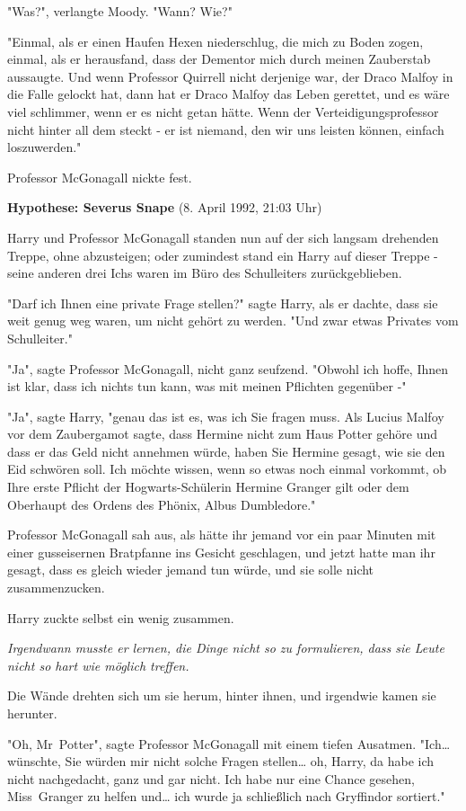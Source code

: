 {"Was?", verlangte Moody. "Wann? Wie?"

"Einmal, als er einen Haufen Hexen niederschlug, die mich zu Boden zogen, einmal, als er herausfand, dass der Dementor mich durch meinen Zauberstab aussaugte. Und wenn Professor Quirrell nicht derjenige war, der Draco Malfoy in die Falle gelockt hat, dann hat er Draco Malfoy das Leben gerettet, und es wäre viel schlimmer, wenn er es nicht getan hätte. Wenn der Verteidigungsprofessor nicht hinter all dem steckt - er ist niemand, den wir uns leisten können, einfach loszuwerden."

Professor McGonagall nickte fest.

\textbf{Hypothese: Severus Snape} (8. April 1992, 21:03 Uhr)

Harry und Professor McGonagall standen nun auf der sich langsam drehenden Treppe, ohne abzusteigen; oder zumindest stand ein Harry auf dieser Treppe - seine anderen drei Ichs waren im Büro des Schulleiters zurückgeblieben.

"Darf ich Ihnen eine private Frage stellen?" sagte Harry, als er dachte, dass sie weit genug weg waren, um nicht gehört zu werden. "Und zwar etwas Privates vom Schulleiter."

"Ja", sagte Professor McGonagall, nicht ganz seufzend. "Obwohl ich hoffe, Ihnen ist klar, dass ich nichts tun kann, was mit meinen Pflichten gegenüber -"

"Ja", sagte Harry, "genau das ist es, was ich Sie fragen muss. Als Lucius Malfoy vor dem Zaubergamot sagte, dass Hermine nicht zum Haus Potter gehöre und dass er das Geld nicht annehmen würde, haben Sie Hermine gesagt, wie sie den Eid schwören soll. Ich möchte wissen, wenn so etwas noch einmal vorkommt, ob Ihre erste Pflicht der Hogwarts-Schülerin Hermine Granger gilt oder dem Oberhaupt des Ordens des Phönix, Albus Dumbledore."

Professor McGonagall sah aus, als hätte ihr jemand vor ein paar Minuten mit einer gusseisernen Bratpfanne ins Gesicht geschlagen, und jetzt hatte man ihr gesagt, dass es gleich wieder jemand tun würde, und sie solle nicht zusammenzucken.

Harry zuckte selbst ein wenig zusammen.

\emph{Irgendwann musste er lernen, die Dinge nicht so zu formulieren, dass sie Leute nicht so hart wie möglich treffen.}

Die Wände drehten sich um sie herum, hinter ihnen, und irgendwie kamen sie herunter.

"Oh, Mr~Potter", sagte Professor McGonagall mit einem tiefen Ausatmen. "Ich… wünschte, Sie würden mir nicht solche Fragen stellen… oh, Harry, da habe ich nicht nachgedacht, ganz und gar nicht. Ich habe nur eine Chance gesehen, Miss~Granger zu helfen und… ich wurde ja schließlich nach Gryffindor sortiert."

}
